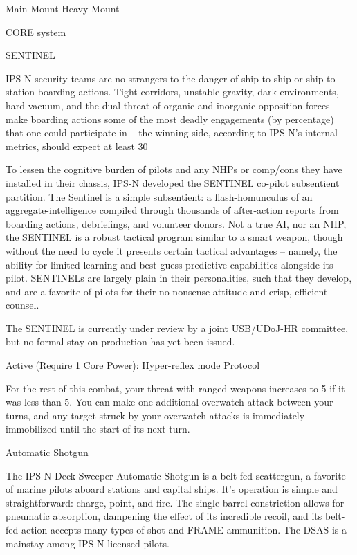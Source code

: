   Main Mount                        Heavy Mount 

                                                CORE system 

                                                                                                            


                                                         SENTINEL
 

  IPS-N security teams are no strangers to the danger of ship-to-ship or ship-to-station boarding actions.  
   Tight corridors, unstable gravity, dark environments, hard vacuum, and the dual threat of organic and  
  inorganic opposition forces make boarding actions some of the most deadly engagements (by  
  percentage) that one could participate in -- the winning side, according to IPS-N’s internal metrics,  
  should expect at least 30%

   To lessen the cognitive burden of pilots and any NHPs or comp/cons they have installed in their chassis,  
  IPS-N developed the SENTINEL co-pilot subsentient partition. The Sentinel is a simple subsentient: a  
  flash-homunculus of an aggregate-intelligence compiled through thousands of after-action reports from  
  boarding actions, debriefings, and volunteer donors. Not a true AI, nor an NHP, the SENTINEL is a  
  robust tactical program similar to a smart weapon, though without the need to cycle it presents certain  
  tactical advantages -- namely, the ability for limited learning and best-guess predictive capabilities  
  alongside its pilot. SENTINELs are largely plain in their personalities, such that they develop, and are a  
  favorite of pilots for their no-nonsense attitude and crisp, efficient counsel.   

   The SENTINEL is currently under review by a joint USB/UDoJ-HR committee, but no formal stay on  
  production has yet been issued.    

  Active (Require 1 Core Power): Hyper-reflex mode  
   Protocol
 
   For the rest of this combat, your threat with ranged weapons increases to 5 if it was less than 5. You  
  can make one additional overwatch attack between your turns, and any target struck by your  
  overwatch attacks is immediately immobilized until the start of its next turn. 

Automatic Shotgun  

The IPS-N Deck-Sweeper Automatic Shotgun is a belt-fed scattergun, a favorite of marine pilots aboard stations and  
capital ships. It’s operation is simple and straightforward: charge, point, and fire. The single-barrel constriction allows  
for pneumatic absorption, dampening the effect of its incredible recoil, and its belt-fed action accepts many types of  
shot-and-FRAME ammunition.   
The DSAS is a mainstay among IPS-N licensed pilots.     

